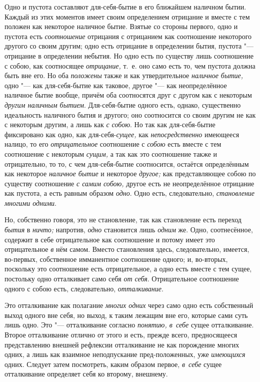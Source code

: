 Одно и пустота составляют для-себя-бытие в его ближайшем наличном бытии.
Каждый из этих моментов имеет своим определением отрицание и вместе с тем
положен как некоторое наличное бытие. Взятые со стороны первого, одно и
пустота есть {\em соотношение} отрицания с отрицанием
как соотношение некоторого другого со своим другим; одно есть отрицание в
определении бытия, пустота "--- отрицание в определении небытия. Но одно есть
по существу лишь соотношение с собою, как соотносящее
{\em отрицание,} т.~е. оно само есть то, чем пустота
должна быть вне его. Но оба {\em положены} также и как
утвердительное {\em наличное бытие,} одно "--- как
для-себя-бытие как таковое, другое "--- как неопределённое наличное бытие
вообще, причём оба соотносятся друг с другом как с некоторым
{\em другим наличным бытием}. Для-себя-бытие одного
есть, однако, существенно идеальность наличного бытия и другого; оно
соотносится со своим другим не как с некоторым другим, а лишь как
{\em с собою}. Но так как для-себя-бытие фиксировано
как одно, как для-себя-{\em сущее,} как
{\em непосредственно} имеющееся налицо, то его
{\em отрицательное} соотношение с
{\em собою} есть вместе с тем соотношение с некоторым
{\em сущим,} а так как это соотношение также и
отрицательно, то то, с чем для-себя-бытие соотносится, остаётся
определённым как некоторое {\em наличное бытие} и
некоторое {\em другое;} как представляющее собою по
существу соотношение {\em с самим собою,} другое есть
не неопределённое отрицание как пустота, а есть равным образом
{\em одно}. Одно есть, следовательно, {\em становление многими одними}.

Но, собственно говоря, это не становление, так как становление есть переход
{\em бытия} в {\em ничто;} напротив, {\em одно} становится лишь
{\em одним} же. Одно, соотнесённое, содержит в себе
отрицательное как соотношение и потому имеет это отрицательное
{\em в} нём самом. Вместо становления здесь,
следовательно, имеется, во-первых, собственное имманентное соотношение
одного; и, во-вторых, поскольку это соотношение есть отрицательное, а одно
есть вместе с тем сущее, постольку одно отталкивает само себя
{\em от себя}. Отрицательное соотношение одного с собою
есть, следовательно, {\em отталкивание}.

Это отталкивание как полагание {\em многих одних} через
само одно есть собственный выход одного вне себя, но выход, к таким лежащим
вне его, которые сами суть лишь одно. Это "--- отталкивание согласно
{\em понятию, в~себе} сущее
отталкивание. Второе отталкивание отлично от этого и есть, прежде всего,
предносящееся представлению внешней рефлексии отталкивание не как
порождение многих одних, а лишь как взаимное неподпускание пред-положенных,
уже {\em имеющихся} одних. Следует затем посмотреть,
каким образом первое, {\em в~себе} сущее отталкивание
определяет себя ко второму, внешнему.

